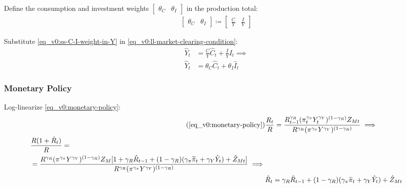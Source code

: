 \documentclass[
thesis.tex
]{subfiles}
\begin{document}
	Define the consumption and investment weights $\left[ \begin{smallmatrix} \theta_C & \theta_I \end{smallmatrix} \right] $ in the production total:
	\begin{align}
		\label{eq_v0:ss-C-I-weight-in-Y}
		\begin{bmatrix}
			\theta_C & \theta_I
		\end{bmatrix} \coloneq 
		\begin{bmatrix}
			\displaystyle \frac{C}{Y} & \displaystyle \frac{I}{Y}
		\end{bmatrix}
	\end{align}
	
	Substitute \ref{eq_v0:ss-C-I-weight-in-Y} in \ref{eq_v0:ll-market-clearing-condition}:
	\begin{align}
		\hat{Y}_t &= \frac{C}{Y}\hat{C}_t + \frac{I}{Y}\hat{I}_t \implies \nonumber \\
		\hat{Y}_t &= \theta_C \hat{C}_t + \theta_I \hat{I}_t 
		\label{eq_v0:ll-market-clearing-condition-theta}
	\end{align}
	
	
	
	
	\subsubsection*{Monetary Policy}
	
	Log-linearize \ref{eq_v0:monetary-policy}:
	\begin{align}
		\tag{\ref{eq_v0:monetary-policy}}
		& \frac{R_t}{R} = \frac{R_{t-1}^{\gamma_R} (\pi_t^{\gamma_\pi} Y_t^{\gamma_Y})^{(1-\gamma_R)} Z_{Mt}}{R^{\gamma_R} (\pi^{\gamma_\pi} Y^{\gamma_Y})^{(1-\gamma_R)}} \implies \\
		\begin{split}
			& \frac{R(1+ \hat{R}_t)}{R} = \\
			&= \frac{ R^{\gamma_R} (\pi^{\gamma_\pi} Y^{\gamma_Y})^{(1-\gamma_R)} Z_{M} [1+ \gamma_R \hat{R}_{t-1} + (1-\gamma_R)(\gamma_\pi \widetilde{\pi}_t + \gamma_Y \hat{Y}_t) + \hat{Z}_{Mt}]}{R^{\gamma_R} (\pi^{\gamma_\pi} Y^{\gamma_Y})^{(1-\gamma_R)}} \implies
		\end{split} \nonumber \\
		& \hat{R}_t = \gamma_R \hat{R}_{t-1} + (1-\gamma_R)(\gamma_\pi \widetilde{\pi}_t + \gamma_Y \hat{Y}_t) + \hat{Z}_{Mt} \label{eq_v0:ll-monetary-policy}
	\end{align}
	
\end{document}
